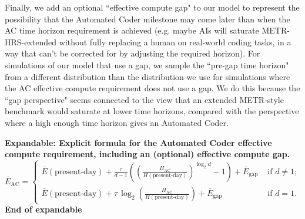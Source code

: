 \documentclass{article}
\theoremstyle{definition}
\newcommand{\ASUG}[1]{\textcolor{magenta}{ALEX-SUGGESTION: #1}}
\begin{document}
Finally, we add an optional ``effective compute gap" to our model to represent the possibility that the Automated Coder milestone may come later than when the AC time horizon requirement is achieved (e.g. maybe AIs will saturate METR-HRS-extended without fully replacing a human on real-world coding tasks, in a way that can't be corrected for by adjusting the required horizon). For simulations of our model that use a gap, we sample the ``pre-gap time horizon" from a different distribution than the distribution we use for simulations where the AC effective compute requirement does not use a gap. We do this because the ``gap perspective" seems connected to the view that an extended METR-style benchmark would saturate at lower time horizons, compared with the perspective where a high enough time horizon gives an Automated Coder.


\textbf{Expandable: Explicit formula for the Automated Coder effective compute requirement, including an (optional) effective compute gap.}
\[     \overline{E}_{\text{AC}}=
    \begin{cases}
        \overline{E}(\text{present-day}) + \frac{\tau}{d-1}\left(\left(\frac{H_{\text{AC}}}{H(\text{present-day})}\right)^{\log_2 d}-1\right) + \overline{E}_{\text{gap}} & \text{ if } d \neq 1; \\
        \overline{E}(\text{present-day}) + \tau \,\log_2\!\left(\frac{H_{\text{AC}}}{H(\text{present-day})}\right) + \overline{E}_{\text{gap}} & \text{ if } d=1.
    \end{cases}\]
\textbf{End of expandable}
\end{document}

